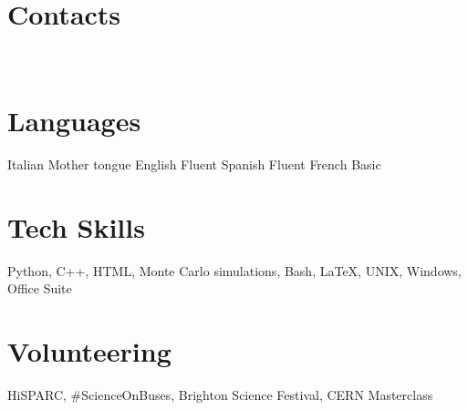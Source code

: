\documentclass[]{cv} %
\newcommand{\profilepic}[1]{\renewcommand{\profilepic}{#1}}
\newlength\imagewidth
\newlength\imagescale
\begin{document}


\begin{aside} %
  \section{Contacts}
\cvmail
\cvnumberphone
\cvaddress
~
\cvsite
\cvlinkedin
\cvsussex
~
\cvdate
~
\section{Languages}
    Italian Mother tongue
    English Fluent
    Spanish Fluent
    French Basic
 \section{Tech Skills} 
  Python, C++, HTML, 
  Monte Carlo simulations, 
  Bash, \LaTeX, UNIX, Windows, Office Suite
  \section{Volunteering}
    HiSPARC, 
    \#ScienceOnBuses,
    Brighton Science Festival,
    CERN Masterclass
\end{aside}
\end{document}
